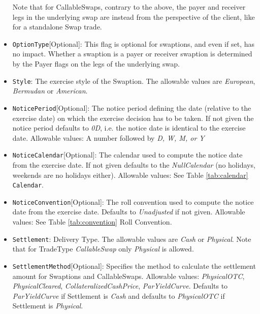 \begin{itemize}
Note that for CallableSwaps, contrary to the above, the payer and receiver legs in the underlying swap are instead from the perspective of the client, like for a standalone Swap trade.



\item \lstinline!OptionType![Optional]: This flag is optional for swaptions, and even if set, has no impact. Whether a swaption is a payer or receiver swaption is determined by the Payer flags on the legs of the underlying swap.

\item  \lstinline!Style!: The exercise style of the Swaption. The allowable values are \emph{European},  \emph{Bermudan} or  \emph{American}. 

\item \lstinline!NoticePeriod![Optional]: The notice period defining the date (relative to the exercise date) on which the exercise
  decision has to be taken. If not given the notice period defaults to \emph{0D}, i.e. the notice date is identical to the
  exercise date. Allowable values: A number followed by \emph{D, W, M, or Y}

\item \lstinline!NoticeCalendar![Optional]: The calendar used to compute the notice date from the exercise date. If not given
  defaults to the \emph{NullCalendar} (no holidays, weekends are no holidays either). Allowable values: See Table \ref{tab:calendar} \lstinline!Calendar!.

\item \lstinline!NoticeConvention![Optional]: The roll convention used to compute the notice date from the exercise date. Defaults to
  \emph{Unadjusted} if not given. Allowable values: See Table \ref{tab:convention} Roll Convention.

\item  \lstinline!Settlement!: Delivery Type. The allowable values are \emph{Cash} or \emph{Physical}. Note that for TradeType \emph{CallableSwap} only \emph{Physical} is allowed.

\item \lstinline!SettlementMethod![Optional]: Specifies the method to calculate the settlement amount for Swaptions and CallableSwaps. Allowable values: \emph{PhysicalOTC}, \emph{PhysicalCleared}, \emph{CollateralizedCashPrice}, \emph{ParYieldCurve}. Defaults to \emph{ParYieldCurve} if Settlement is \emph{Cash} and defaults to \emph{PhysicalOTC} if Settlement is \emph{Physical}.


\end{itemize}
